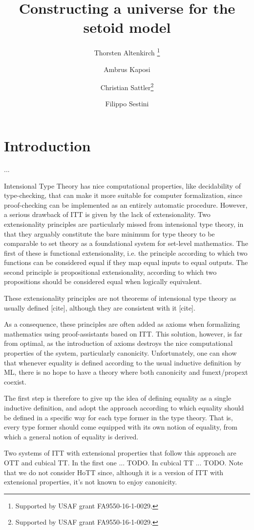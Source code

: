\documentclass{easychair}
\title{Constructing a universe for the setoid model}
\author{
  Thorsten Altenkirch \inst{1}\thanks{Supported by USAF grant FA9550-16-1-0029.}
\and
  Ambrus Kaposi \inst{2}
\and
  Christian Sattler\inst{1}\thanks{Supported by USAF grant FA9550-16-1-0029.}
\and
  Filippo Sestini\inst{1}
}
\institute{
  School of Computer Science, University of Nottingham, UK\\
  \email{\{psztxa,pszcs1,psxfs5\}@nottingham.ac.uk}
  \and
  E{\"o}tv{\"o}s Lor{\'a}nd University, Budapest, Hungary\\
  \email{akaposi@inf.elte.hu}
}
\begin{document}
\maketitle

\section{Introduction}

...


Intensional Type Theory has nice computational properties, like decidability of
type-checking, that can make it more suitable for computer formalization, since
proof-checking can be implemented as an entirely automatic procedure.
%
However, a serious drawback of ITT is given by the lack of extensionality.
%
Two extensionality principles are particularly missed from intensional type
theory, in that they arguably constitute the bare minimum for type theory to be
comparable to set theory as a foundational system for set-level mathematics.
%
The first of these is functional extensionality, i.e. the principle according to
which two functions can be considered equal if they map equal inputs to equal
outputs.
%
The second principle is propositional extensionality, according to which two
propositions should be considered equal when logically equivalent.

These extensionality principles are not theorems of intensional type theory as
usually defined [cite], although they are consistent with it [cite].

As a consequence, these principles are often added as axioms when formalizing
mathematics using proof-assistants based on ITT. This solution, however, is far
from optimal, as the introduction of axioms destroys the nice computational
properties of the system, particularly canonicity. Unfortunately, one can show
that whenever equality is defined according to the usual inductive definition by
ML, there is no hope to have a theory where both canonicity and funext/propext
coexist.

The first step is therefore to give up the idea of defining equality as a single
inductive definition, and adopt the approach according to which equality should
be defined in a specific way for each type former in the type theory. That is,
every type former should come equipped with its own notion of equality, from
which a general notion of equality is derived.

Two systems of ITT with extensional properties that follow this approach are OTT
and cubical TT. In the first one ... TODO. In cubical TT ... TODO. Note that we
do not consider HoTT since, although it is a version of ITT with extensional
properties, it's not known to enjoy canonicity.
\end{document}
